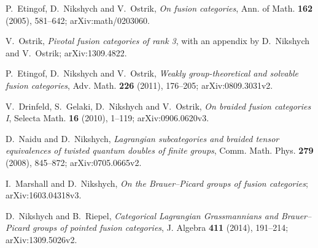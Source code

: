 P.~Etingof, D.~Nikshych and V.~Ostrik,
\emph{On fusion categories}, Ann. of Math. \textbf{162} (2005), 581--642;
arXiv:math/0203060.

V.~Ostrik,
\emph{Pivotal fusion categories of rank 3}, with an appendix by
D.~Nikshych and V.~Ostrik;
arXiv:1309.4822.

P.~Etingof, D.~Nikshych and V.~Ostrik,
\emph{Weakly group-theoretical and solvable fusion categories},
Adv. Math. \textbf{226} (2011), 176--205;
arXiv:0809.3031v2.

V.~Drinfeld, S.~Gelaki, D.~Nikshych and V.~Ostrik,
\emph{On braided fusion categories I},
Selecta Math. \textbf{16} (2010), 1--119;
arXiv:0906.0620v3.

D.~Naidu and D.~Nikshych,
\emph{Lagrangian subcategories and braided tensor equivalences of twisted
quantum doubles of finite groups},
Comm. Math. Phys. \textbf{279} (2008), 845--872;
arXiv:0705.0665v2.

I.~Marshall and D.~Nikshych,
\emph{On the Brauer--Picard groups of fusion categories};
arXiv:1603.04318v3.

D.~Nikshych and B.~Riepel,
\emph{Categorical Lagrangian Grassmannians and Brauer--Picard groups of
pointed fusion categories},
J. Algebra \textbf{411} (2014), 191--214;
arXiv:1309.5026v2.
